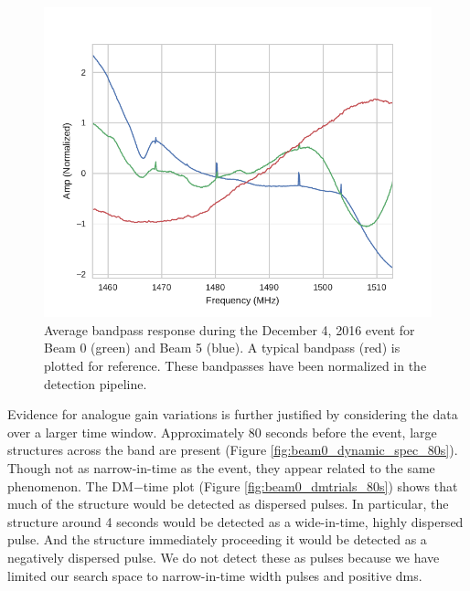 \documentclass[a4paper,fleqn,usenatbib]{mnras}
\begin{document}
\begin{figure}
    \includegraphics[width=1.0\linewidth]{figures/bandpass_response.pdf}
    \caption{Average bandpass response during the December 4, 2016 event for
    Beam 0 (green) and Beam 5 (blue). A typical bandpass (red) is plotted for
    reference. These bandpasses have been normalized in the detection pipeline.
    }
    \label{fig:bandpass_response}
\end{figure}

Evidence for analogue gain variations is further justified by considering the data
over a larger time window.  Approximately 80 seconds before the event, large structures
across the band are present (Figure \ref{fig:beam0_dynamic_spec_80s}). Though
not as narrow-in-time as the event, they appear related to the same phenomenon.
The DM$-$time plot (Figure \ref{fig:beam0_dmtrials_80s}) shows that much of the
structure would be detected as dispersed pulses.  In particular, the structure
around 4 seconds would be detected as a wide-in-time, highly dispersed pulse.
And the structure immediately proceeding it would be detected as a negatively
dispersed pulse.  We do not detect these as pulses because we have limited our
search space to narrow-in-time width pulses and positive \glspl{dm}.
\end{document}
